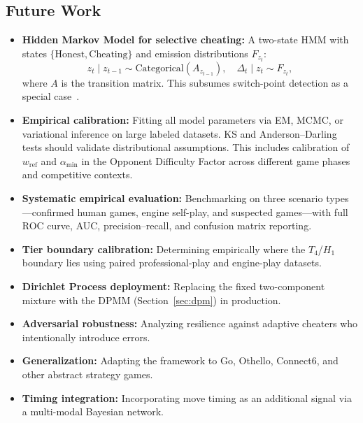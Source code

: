 \documentclass[11pt,a4paper]{article}
\begin{document}
\subsection{Future Work}

\begin{itemize}
    \item \textbf{Hidden Markov Model for selective cheating:}
          A two-state HMM with states $\{\text{Honest}, \text{Cheating}\}$
          and emission distributions $F_{z_t}$:
          \begin{equation}
              z_t \mid z_{t-1} \sim \text{Categorical}(A_{z_{t-1}}),
              \quad \Delta_t \mid z_t \sim F_{z_t},
          \end{equation}
          where $A$ is the transition matrix. This subsumes switch-point
          detection as a special case~\citep{rabiner1989tutorial}.

    \item \textbf{Empirical calibration:} Fitting all model parameters via
          EM, MCMC, or variational inference on large labeled datasets. KS
          and Anderson--Darling tests should validate distributional
          assumptions. This includes calibration of $w_{\text{ref}}$ and
          $\alpha_{\min}$ in the Opponent Difficulty Factor across different
          game phases and competitive contexts.

    \item \textbf{Systematic empirical evaluation:} Benchmarking on three
          scenario types---confirmed human games, engine self-play, and
          suspected games---with full ROC curve, AUC, precision--recall,
          and confusion matrix reporting.

    \item \textbf{Tier boundary calibration:} Determining empirically where
          the $T_4$/$H_1$ boundary lies using paired professional-play and
          engine-play datasets.

    \item \textbf{Dirichlet Process deployment:} Replacing the fixed two-component
          mixture with the DPMM (Section~\ref{sec:dpm}) in production.

    \item \textbf{Adversarial robustness:} Analyzing resilience against adaptive
          cheaters who intentionally introduce errors.

    \item \textbf{Generalization:} Adapting the framework to Go, Othello,
          Connect6, and other abstract strategy games.

    \item \textbf{Timing integration:} Incorporating move timing as an additional
          signal via a multi-modal Bayesian network.
\end{itemize}
\end{document}
